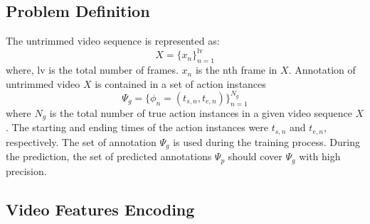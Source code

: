 \subsection{Problem Definition}
The untrimmed video sequence is represented as:
\begin{equation}
X = \{x_n\}^{\text{lv}}_{n=1}
\end{equation}
where, lv is the total number of frames. \(x_n\) is the nth frame in \(X\). Annotation of untrimmed video \(X\) is contained in a set of action instances 
\begin{equation}
    \Psi_g = \{\phi_n = (t_{s,n}, t_{e,n})\}^{N_g}_{n=1}
\end{equation}
where \(N_g\) is the total number of true action instances in a given video sequence \(X\). The starting and ending times of the action instances were \(t_{s,n}\) and \(t_{e,n}\), respectively. The set of annotation \(\Psi_g\) is used during the training process. During the prediction, the set of predicted annotations \(\Psi_p\) should cover \(\Psi_g\) with high precision.
\subsection{Video Features Encoding}

